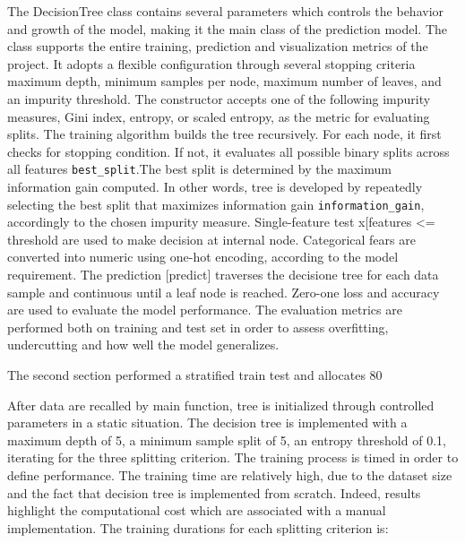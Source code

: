 \documentclass{article}
\begin{document}
The DecisionTree class contains several parameters which controls the behavior and growth of the model, making it the main class of the prediction model. The class supports the entire training, prediction and visualization metrics of the project. It adopts a flexible configuration through several stopping criteria maximum depth, minimum samples per node, maximum number of leaves, and an impurity threshold. The constructor accepts one of the following impurity measures, Gini index, entropy, or scaled entropy, as the metric for evaluating splits.
The training algorithm builds the tree recursively. For each node, it first checks for stopping condition. If not, it evaluates all possible binary splits across all features \texttt{best\_split}.The best split is determined by the maximum information gain computed.
In other words, tree is developed by repeatedly selecting the best split that maximizes information gain \texttt{information\_gain}, accordingly to the chosen impurity measure.
Single-feature test x[features <= threshold are used to make decision at internal node. Categorical fears are converted into numeric using one-hot encoding, according to the model requirement.
The prediction [predict] traverses the decisione tree for each data sample and continuous until a leaf node is reached. Zero-one loss and accuracy are used to evaluate the model performance. The evaluation metrics are performed both on training and test set in order to assess overfitting, undercutting and how well the model generalizes.

The second section performed a stratified train test and allocates 80%

After data are recalled by main function, tree is initialized through controlled parameters in a static situation. The decision tree is implemented with a maximum depth of 5, a minimum sample split of 5, an entropy threshold of 0.1, iterating for the three splitting criterion. The training process is timed in order to define performance. The training time are relatively high, due to the dataset size and the fact that decision tree is implemented from scratch. Indeed, results highlight the computational cost which are associated with a manual implementation. The training durations for each splitting criterion is:
\end{document}
